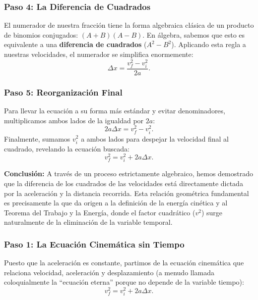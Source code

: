 \documentclass[11pt,a4paper]{book}
\begin{document}
\subsubsection{Paso 4: La Diferencia de Cuadrados}

El numerador de nuestra fracción tiene la forma algebraica clásica de un producto de binomios conjugados: $(A + B)(A - B)$. En álgebra, sabemos que esto es equivalente a una \textbf{diferencia de cuadrados} ($A^2 - B^2$). Aplicando esta regla a nuestras velocidades, el numerador se simplifica enormemente:
\begin{equation}
    \Delta x = \frac{v_f^2 - v_i^2}{2a}.
\end{equation}

\subsubsection{Paso 5: Reorganización Final}

Para llevar la ecuación a su forma más estándar y evitar denominadores, multiplicamos ambos lados de la igualdad por $2a$:
\begin{equation}
    2a \Delta x = v_f^2 - v_i^2.
\end{equation}
Finalmente, sumamos $v_i^2$ a ambos lados para despejar la velocidad final al cuadrado, revelando la ecuación buscada:
\begin{equation}
    v_f^2 = v_i^2 + 2a\Delta x.
\end{equation}

\textbf{Conclusión:}
A través de un proceso estrictamente algebraico, hemos demostrado que la diferencia de los cuadrados de las velocidades está directamente dictada por la aceleración y la distancia recorrida. Esta relación geométrica fundamental es precisamente la que da origen a la definición de la energía cinética y al Teorema del Trabajo y la Energía, donde el factor cuadrático ($v^2$) surge naturalmente de la eliminación de la variable temporal.

\subsubsection{Paso 1: La Ecuación Cinemática sin Tiempo}

Puesto que la aceleración es constante, partimos de la ecuación cinemática que relaciona velocidad, aceleración y desplazamiento (a menudo llamada coloquialmente la ``ecuación eterna'' porque no depende de la variable tiempo):
\begin{equation}
    v_f^2 = v_i^2 + 2a\Delta x.
\end{equation}
\end{document}
